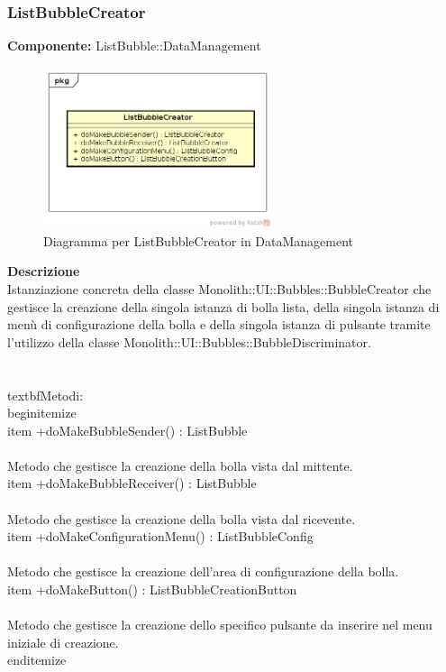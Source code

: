 \clearpage

\subsubsection{ListBubbleCreator}
\textbf{Componente:}  ListBubble::DataManagement\\
   \FloatBarrier
   \begin{figure}[ht]
   \centering
   \includegraphics[width=0.6\textwidth]{img/single-ListBubbleCreator}
   \caption{{Diagramma per ListBubbleCreator in DataManagement}}
\end{figure}
\FloatBarrier
\textbf{Descrizione}\\
Istanziazione concreta della classe Monolith::UI::Bubbles::BubbleCreator che gestisce la creazione della singola istanza di bolla lista, della singola istanza di menù di configurazione della bolla e della singola istanza di pulsante tramite l'utilizzo della classe Monolith::UI::Bubbles::BubbleDiscriminator.
\\\\
\\textbf{Metodi:} 
\\begin{itemize}
\\item +doMakeBubbleSender() : ListBubble 
\\\\
Metodo che gestisce la creazione della bolla vista dal mittente.
\\item +doMakeBubbleReceiver() : ListBubble 
\\\\
Metodo che gestisce la creazione della bolla vista dal ricevente.
\\item +doMakeConfigurationMenu() : ListBubbleConfig 
\\\\
Metodo che gestisce la creazione dell'area di configurazione della bolla.
\\item +doMakeButton() : ListBubbleCreationButton 
\\\\
Metodo che gestisce la creazione dello specifico pulsante da inserire nel menu iniziale di creazione.
\\end{itemize} 


